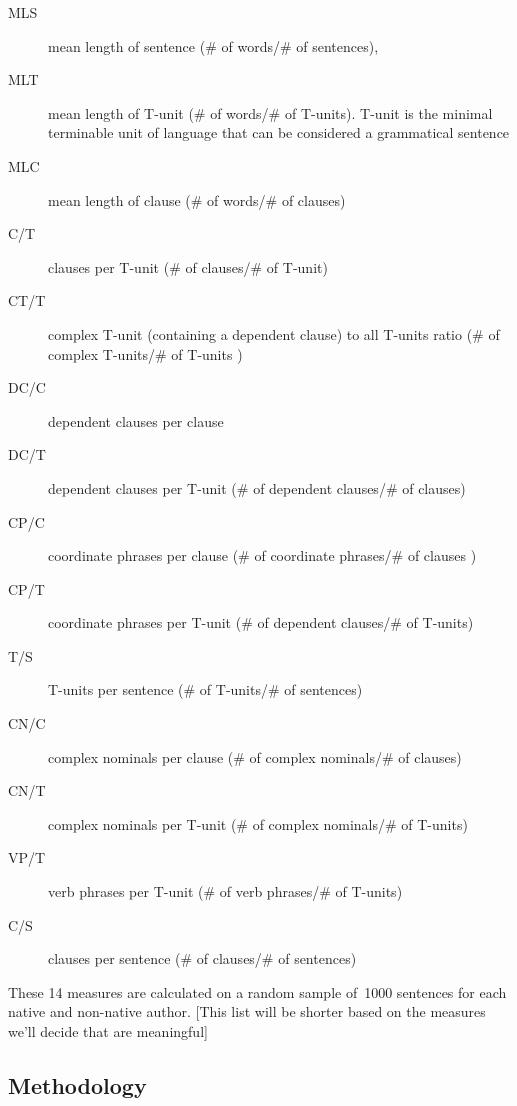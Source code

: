 \documentclass[11pt]{article}
\begin{document}
\begin{description}
\item[MLS] mean length of sentence (\# of words/\# of sentences), 
\item[MLT] mean length of T-unit (\# of words/\# of T-units). T-unit is the minimal terminable unit of language that can be considered a grammatical sentence 
\item[MLC] mean length of clause (\# of words/\# of clauses)
\item[C/T] clauses per T-unit (\# of clauses/\# of T-unit)
\item[CT/T] complex T-unit (containing a dependent clause) to all T-units ratio (\# of complex T-units/\# of T-units )
\item[DC/C] dependent clauses per clause
\item[DC/T] dependent clauses per T-unit (\# of dependent clauses/\# of clauses)
\item[CP/C] coordinate phrases per clause (\# of coordinate phrases/\# of clauses )
\item[CP/T] coordinate phrases per T-unit (\# of dependent clauses/\# of T-units)
\item[T/S] T-units per sentence (\# of T-units/\# of sentences)
\item[CN/C] complex nominals per clause (\# of complex nominals/\# of clauses)
\item[CN/T]  complex nominals per T-unit (\# of complex nominals/\# of T-units)
\item[VP/T] verb phrases per T-unit (\# of verb phrases/\# of T-units)
\item[C/S] clauses per sentence (\# of clauses/\# of sentences)
\end{description}

These 14 measures are calculated on a random sample of~1000 sentences for each native and non-native author. 
[This list will be shorter based on the measures we’ll decide that are meaningful]


\subsection{Methodology}
\end{document}
